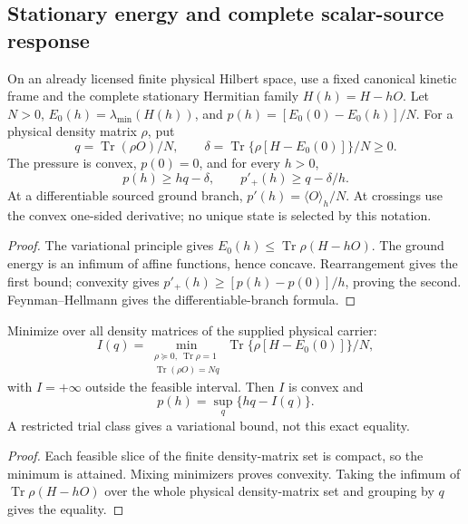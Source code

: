 \documentclass[12pt,a4paper]{article}
\begin{document}
\subsection{Stationary energy and complete scalar-source response}
\label{p4:sec:stationary-source-energy}
\begin{theorem}
\label{p4:thm:finite-energy-source-certificate}
On an already licensed finite physical Hilbert space, use a fixed canonical
kinetic frame and the complete stationary Hermitian family
$H(h)=H-hO$. Let $N>0$, $E_0(h)=\lambda_{\min}(H(h))$, and
$p(h)=[E_0(0)-E_0(h)]/N$. For a physical density matrix $\rho$, put
\[
 q=\operatorname{Tr}(\rho O)/N,\qquad
 \delta=\operatorname{Tr}\{\rho[H-E_0(0)]\}/N\ge0.
\]
The pressure is convex, $p(0)=0$, and for every $h>0$,
\[
 \boxed{p(h)\ge hq-\delta,\qquad
 p'_+(h)\ge q-\delta/h.}
\]
At a differentiable sourced ground branch,
$p'(h)=\langle O\rangle_h/N$. At crossings use the convex one-sided
derivative; no unique state is selected by this notation.
\end{theorem}
\begin{proof}
The variational principle gives
$E_0(h)\le\operatorname{Tr}\rho(H-hO)$.
The ground energy is an infimum of affine functions, hence concave.
Rearrangement gives the first bound; convexity gives
$p'_+(h)\ge[p(h)-p(0)]/h$, proving the second. Feynman--Hellmann
gives the differentiable-branch formula.
\end{proof}

\begin{corollary}
\label{p4:cor:finite-constrained-energy-duality}
Minimize over all density matrices of the supplied physical carrier:
\[
 I(q)=\min_{\substack{\rho\succeq0,\ \operatorname{Tr}\rho=1\\
                 \operatorname{Tr}(\rho O)=Nq}}
       \operatorname{Tr}\{\rho[H-E_0(0)]\}/N,
\]
with $I=+\infty$ outside the feasible interval. Then $I$ is convex and
\[
 \boxed{p(h)=\sup_q\{hq-I(q)\}.}
\]
A restricted trial class gives a variational bound, not this exact equality.
\end{corollary}
\begin{proof}
Each feasible slice of the finite density-matrix set is compact, so the
minimum is attained. Mixing minimizers proves convexity. Taking the
infimum of $\operatorname{Tr}\rho(H-hO)$ over the whole physical
density-matrix set and grouping by $q$ gives the equality.
\end{proof}
\end{document}
